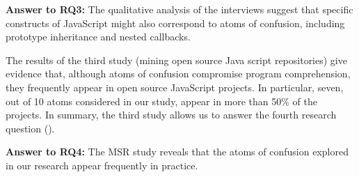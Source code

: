 \begin{mh}
  {\bf Answer to RQ3:} The qualitative analysis of the
  interviews suggest that specific constructs of
  JavaScript might also correspond to atoms of
  confusion, including prototype inheritance and
  nested callbacks. 
\end{mh}

The results of the third study (mining open source
Java script repositories) give evidence that,
although atoms of confusion compromise program
comprehension, they frequently appear in open
source JavaScript projects. In particular,
seven, out of 10 atoms considered
  in our study, appear in more than 50\% of
the projects. 
In summary, the third study
allows us to answer the fourth research
question (\emph{\rqd}).


\begin{mh}
  {\bf Answer to RQ4:} The MSR study reveals that
  the atoms of confusion explored in our research
  appear frequently in practice. 
\end{mh}






